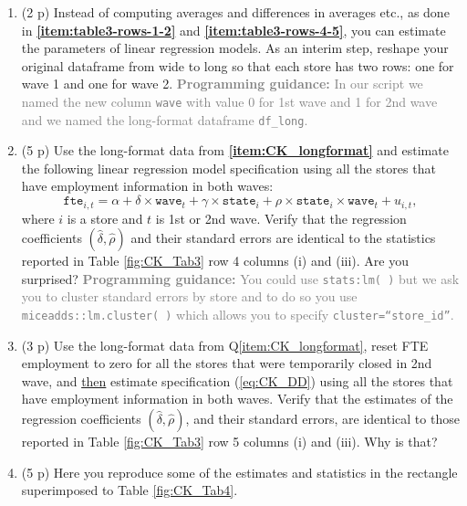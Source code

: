 \documentclass[
]{article}
\begin{document}
\begin{enumerate}
\def\labelenumi{\arabic{enumi}.}
\setcounter{enumi}{14}
\item
  (2 p) Instead of computing averages and differences in averages etc.,
  as done in \textbf{\ref{item:table3-rows-1-2}} and
  \textbf{\ref{item:table3-rows-4-5}}, you can estimate the parameters
  of linear regression models. As an interim step, reshape your original
  dataframe from wide to long so that each store has two rows: one for
  wave 1 and one for wave 2.
  \textcolor{gray}{\textbf{Programming guidance:} In our script we named the new column \texttt{wave} with value 0 for 1st wave and 1 for 2nd wave and we named the long-format dataframe \texttt{df\_long}.}\label{item:CK_longformat}
\item
  (5 p) Use the long-format data from \textbf{\ref{item:CK_longformat}}
  and estimate the following linear regression model specification using
  all the stores that have employment information in both waves:
  \begin{equation}\label{eq:CK_DD}
  \texttt{fte}_{i,t}=\alpha + \delta \times \texttt{wave}_t + \gamma \times \texttt{state}_i + \rho \times \texttt{state}_i\times\texttt{wave}_{t}+u_{i,t},
  \end{equation} \noindent where \(i\) is a store and \(t\) is 1st or
  2nd wave. Verify that the regression coefficients
  \((\hat{\delta}, \hat{\rho})\) and their standard errors are identical
  to the statistics reported in Table \ref{fig:CK_Tab3} row 4 columns
  (i) and (iii). Are you surprised?
  \textcolor{gray}{\textbf{Programming guidance:} You could use \texttt{stats:lm( )} but we ask you to cluster standard errors by store and to do so you use \texttt{miceadds::lm.cluster( )} which allows you to specify \texttt{cluster=``store\_id''}.}
\item
  (3 p) Use the long-format data from Q\ref{item:CK_longformat}, reset
  FTE employment to zero for all the stores that were temporarily closed
  in 2nd wave, and \underline{then} estimate specification
  (\ref{eq:CK_DD}) using all the stores that have employment information
  in both waves. Verify that the estimates of the regression
  coefficients \((\hat{\delta}, \hat{\rho})\), and their standard
  errors, are identical to those reported in Table \ref{fig:CK_Tab3} row
  5 columns (i) and (iii). Why is that?
\item
  (5 p) Here you reproduce some of the estimates and statistics in the
  rectangle superimposed to Table
  \ref{fig:CK_Tab4}.\label{item:CK_tab4-col-i-ii}
\end{enumerate}
\end{document}

